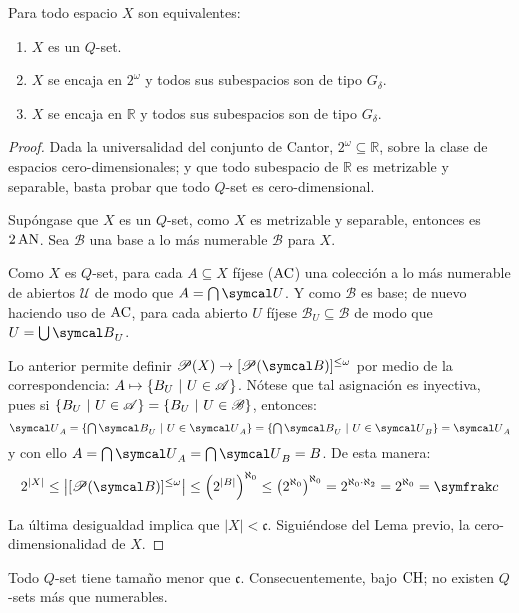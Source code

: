 \begin{proposicion}\label{prop-QsetEquivs}
	Para todo espacio $X$ son equivalentes:
	\begin{enumerate}
		\item $X$ es un $Q$-set.
		\item $X$ se encaja en $2^\omega$ y todos sus subespacios son de tipo $G_\delta$.
		\item $X$ se encaja en $\mathbb{R}$ y todos sus subespacios son de tipo $G_\delta$.
	\end{enumerate}
\end{proposicion}
\begin{proof}
	Dada la universalidad del conjunto de Cantor, $2^\omega \subseteq \mathbb{R}$, sobre la clase de espacios cero-dimensionales; y que todo subespacio de $\mathbb{R}$ es metrizable y separable, basta probar que todo $Q$-set es cero-dimensional.

	Supóngase que $X$ es un $Q$-set, como $X$ es metrizable y separable, entonces es $2\operatorname{AN}$. Sea $\mathcal{B}$ una base a lo más numerable $\mathcal{B}$ para $X$.

	Como $X$ es $Q$-set, para cada $A \subseteq X$ fíjese ($\operatorname{AC}$) una colección a lo más numerable de abiertos $\mathcal{U}$ de modo que $A=\midcap \mathcal{U}$. Y como $\mathcal{B}$ es base; de nuevo haciendo uso de $\operatorname{AC}$, para cada abierto $U$ fíjese $\mathcal{B}_U \subseteq \mathcal{B}$ de modo que $U=\midcup \mathcal{B}_U$.

	Lo anterior permite definir $\ms{P}(X) \to [\ms{P}(\mathcal{B})]^{\leq \omega}$ por medio de la correspondencia: $A \mapsto \{B_U \text{ $|$ } U \in \mathscr{A}\}$. Nótese que tal asignación es inyectiva, pues si $\{B_U \text{ $|$ } U \in \mathscr{A}\}=\{B_U \text{ $|$ } U \in \mathscr{B}\}$, entonces:
	\[ \mathcal{U}_A = \{\midcap \mathcal{B}_U \tq U \in \mathcal{U}_A\} = \{\midcap \mathcal{B}_U \tq U \in \mathcal{U}_B\} = \mathcal{U}_A \]
	y con ello $A=\midcap \mathcal{U}_A = \midcap \mathcal{U}_B = B$. De esta manera:
	\[ 2^{|X|} \leq \left| [\ms{P}(\mathcal{B})]^{\leq \omega} \right| \leq \left( 2^{|B|} \right)^{\aleph_0} \leq \left( 2^{\aleph_0} \right) ^{\aleph_0} = 2^{\aleph_0 \cdot \aleph_2} = 2^{\aleph_0} = \mathfrak{c} \]

	La última desigualdad implica que $|X| < \mathfrak{c}$. Siguiéndose del Lema previo, la cero-dimensionalidad de $X$.
\end{proof}

\begin{observacion}\label{obs-HCNoQset}
	Todo $Q$-set tiene tamaño menor que $\mathfrak{c}$. Consecuentemente, bajo $\operatorname{CH}$; no existen $Q$-sets más que numerables.
\end{observacion}

